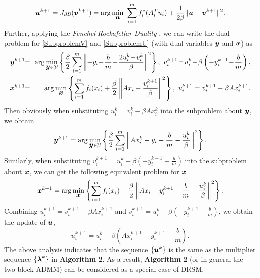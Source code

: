 \documentclass{mcom-l}
\theoremstyle{definition}
\theoremstyle{remark}
\numberwithin{equation}{section}
\begin{document}
{\begin{eqnarray}
\end{eqnarray}
\begin{equation}
{{\mbox{\boldmath $u$}}}^{k+1} = J_{\beta {\mathcal{B}}}({{\mbox{\boldmath $v$}}}^{k+1})=\arg\min_{{\mbox{\boldmath $u$}}}\ \sum_{i=1}^m f_i^* (A_i^T u_i) + \frac{1}{2\beta}\|{{\mbox{\boldmath $u$}}} - {{\mbox{\boldmath $v$}}}^{k+1}\|^2.\label{SubproblemU}
\end{equation}
Further, applying the {\em{Fenchel-Rockafellar Duality}} \cite[Definition 15.19]{BauschkeCombettes2011}, we can write the dual problem for \eqref{SubproblemV} and \eqref{SubproblemU} (with dual variables ${{\mbox{\boldmath $y$}}}$ and ${{\mbox{\boldmath $x$}}}$) as
\begin{eqnarray}
{{\mbox{\boldmath $y$}}}^{k+1} \!\!&=&\!\!\arg\min_{{{\mbox{\boldmath $y$}}}\in {\mathcal{Y}}}\left\{ \frac{\beta}{2} \sum_{i=1}^m \left\| - y_i \!-\! \frac{b}{m} \!-\! \frac{2 u_i^k \!-\! v_i^k}{\beta} \right\|^2 \right\}, \ v_i^{k+1} \!=\! u_i^k \!-\! \beta \left(- y_i^{k+1} \!-\! \frac{b}{m}\right), \nonumber\\
{{\mbox{\boldmath $x$}}}^{k+1} \!\!&=&\!\!\arg\min_{{\mbox{\boldmath $x$}}} \left\{ \sum_{i=1}^m f_i ( x_i) + \frac{\beta}{2}\left\| Ax_i - \frac{v_i^{k+1}}{\beta}\right\|^2 \right\},\ u_i^{k+1} = v_i^{k+1} - \beta A x_i^{k+1}\nonumber.
\end{eqnarray}
Then obviously when substituting $u_i^k = v_i^k - \beta A x_i^k$ into the subproblem about ${{\mbox{\boldmath $y$}}}$, we obtain
$$
{{\mbox{\boldmath $y$}}}^{k+1} = \arg\min_{{{\mbox{\boldmath $y$}}}\in {\mathcal{Y}}}\left\{ \frac{\beta}{2} \sum_{i=1}^m \left\| A x_i^k - y_i - \frac{b}{m}  - \frac{u_i^k}{\beta} \right\|^2 \right\}.
$$
Similarly, when substituting $v_i^{k+1} = u_i^k - \beta \left(- y_i^{k+1} - \frac{b}{m}\right)$ into the subproblem about ${{\mbox{\boldmath $x$}}}$, we can get the following equivalent problem for ${{\mbox{\boldmath $x$}}}$
$$
{{\mbox{\boldmath $x$}}}^{k+1} = \arg\min_{{\mbox{\boldmath $x$}}} \left\{ \sum_{i=1}^m f_i ( x_i) + \frac{\beta}{2}\left\| Ax_i - y_i^{k+1} - \frac{b}{m} - \frac{u_i^k}{\beta}\right\|^2 \right\}.
$$
Combining $u_i^{k+1} = v_i^{k+1} - \beta A x_i^{k+1}$ and $v_i^{k+1} = u_i^k - \beta \left(- y_i^{k+1} - \frac{b}{m}\right)$, we obtain the update of ${{\mbox{\boldmath $u$}}}$,
$$
u_i^{k+1} = u_i^k - \beta \left(A x_i^{k+1} - y_i^{k+1} - \frac{b}{m}\right).
$$
The above analysis indicates that the sequence $\{{{\mbox{\boldmath $u$}}}^k\}$ is the same as the multiplier sequence $\{{{\mbox{\boldmath $\lambda$}}}^k\}$ in {\bf{Algorithm 2}}. As a result, {\bf Algorithm 2} (or in general the two-block ADMM) can be considered as a special case of DRSM.

}
\end{document}
